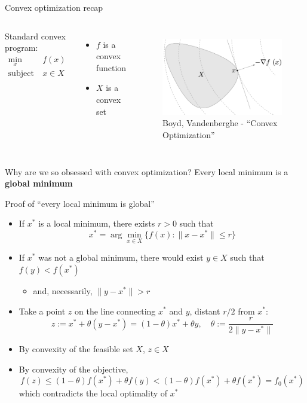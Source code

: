 \documentclass[aspectratio=169]{beamer}
\begin{document}
\begin{frame}{Convex optimization recap}
\begin{columns}
Standard convex program:
\begin{align*}
\min_{x} \ &f(x) \\
\text{subject to} \ & x \in X
\end{align*}
\begin{itemize}
\item
$f$ is a convex function
\item
$X$ is a convex set
\end{itemize}
\begin{figure}
\includegraphics[width=.8\columnwidth]{figures/convex_opt.png} \\
\footnotesize Boyd, Vandenberghe - ``Convex Optimization''
\end{figure}
\end{columns}
\pause
\begin{block}{Why are we so obsessed with convex optimization?}
Every local minimum is a \textbf{global minimum}
\end{block}
\end{frame}

\begin{frame}{Proof of ``every local minimum is global''}
\begin{itemize}
\item
If $x^*$ is a local minimum, there exists $r > 0$ such that
$$
x^* = \arg \min_{x \in X} \{ f(x) : \|x - x^*\| \leq r \}
$$
\pause
\item
If $x^*$ was not a global minimum, there would exist $y \in X$ such that $f(y) < f(x^*)$
\begin{itemize}
\item
and, necessarily, $\|y - x^*\| > r$
\end{itemize}
\pause
\item
Take a point $z$ on the line connecting $x^*$ and $y$, distant $r/2$ from $x^*$:
$$
z := x^* + \theta (y - x^*) = (1 - \theta) x^* + \theta y, \quad \theta := \frac{r}{2 \|y - x^*\|}
$$
\pause
\item
By convexity of the feasible set $X$, $z \in X$
\pause
\item
By convexity of the objective,
$$
f(z) \leq (1 - \theta) f(x^*) + \theta f(y) < (1 - \theta) f(x^*) + \theta f(x^*) = f_0(x^*)
$$
which contradicts the local optimality of $x^*$
\end{itemize}
\end{frame}
\end{document}
